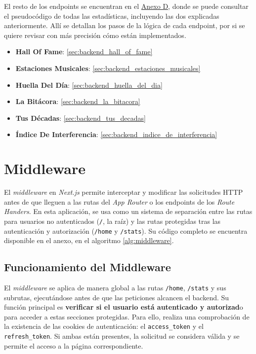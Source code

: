 El resto de los endpoints se encuentran en el \hyperref[ch:anexoD]{Anexo D}, donde se puede consultar el pseudocódigo de todas las estadísticas, incluyendo las dos explicadas anteriormente. Allí se detallan los pasos de la lógica de cada endpoint, por si se quiere revisar con más precisión cómo están implementados.

\begin{itemize}
    \item \textbf{Hall Of Fame}: \ref{sec:backend_hall_of_fame}
    \item \textbf{Estaciones Musicales}: \ref{sec:backend_estaciones_musicales}
    \item \textbf{Huella Del Día}: \ref{sec:backend_huella_del_dia}
    \item \textbf{La Bitácora}: \ref{sec:backend_la_bitacora}
    \item \textbf{Tus Décadas}: \ref{sec:backend_tus_decadas}
    \item \textbf{Índice De Interferencia}: \ref{sec:backend_indice_de_interferencia}
\end{itemize}

\section{Middleware}

El \textit{middleware} en \textit{Next.js} permite interceptar y modificar las solicitudes HTTP antes de que lleguen a las rutas del \textit{App Router} o los endpoints de los \textit{Route Handers}. En esta aplicación, se usa como un sistema de separación entre las rutas para usuarios no autenticados (\texttt{/}, la raíz) y las rutas protegidas tras las autenticación y autorización (\texttt{/home} y \texttt{/stats}). Su código completo se encuentra disponible en el anexo, en el algoritmo \ref{alg:middleware}.

\subsection{Funcionamiento del Middleware}

El \textit{middleware} se aplica de manera global a las rutas \texttt{/home}, \texttt{/stats} y sus subrutas, ejecutándose antes de que las peticiones alcancen el backend. Su función principal es \textbf{verificar si el usuario está autenticado y autorizad}o para acceder a estas secciones protegidas. Para ello, realiza una comprobación de la existencia de las cookies de autenticación: el \texttt{access\_token} y el \texttt{refresh\_token}. Si ambas están presentes, la solicitud se considera válida y se permite el acceso a la página correspondiente.

